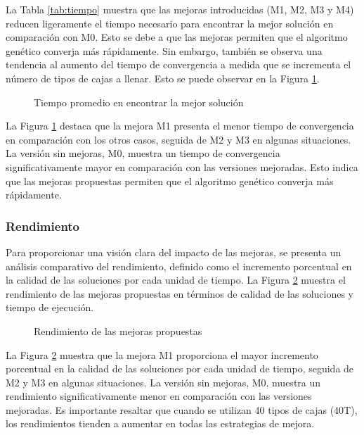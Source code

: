 La Tabla \ref{tab:tiempo} muestra que las mejoras introducidas (M1, M2, M3 y M4) reducen ligeramente el tiempo necesario para encontrar la mejor solución en comparación con M0. Esto se debe a que las mejoras permiten que el algoritmo genético converja más rápidamente. Sin embargo, también se observa una tendencia al aumento del tiempo de convergencia a medida que se incrementa el número de tipos de cajas a llenar. Esto se puede observar en la Figura \ref{fig:tiempos}.

\begin{figure}[H]
    \centering
    
    \caption{Tiempo promedio en encontrar la mejor solución}
    \label{fig:tiempos}
\end{figure}

La Figura \ref{fig:tiempos} destaca que la mejora M1 presenta el menor tiempo de convergencia en comparación con los otros casos, seguida de M2 y M3 en algunas situaciones. La versión sin mejoras, M0, muestra un tiempo de convergencia significativamente mayor en comparación con las versiones mejoradas. Esto indica que las mejoras propuestas permiten que el algoritmo genético converja más rápidamente.

\subsubsection{Rendimiento}

Para proporcionar una visión clara del impacto de las mejoras, se presenta un análisis comparativo del rendimiento, definido como el incremento porcentual en la calidad de las soluciones por cada unidad de tiempo. La Figura \ref{fig:rendimiento} muestra el rendimiento de las mejoras propuestas en términos de calidad de las soluciones y tiempo de ejecución.

\begin{figure}[H]
    \centering
    
    \caption{Rendimiento de las mejoras propuestas}
    \label{fig:rendimiento}
\end{figure}

La Figura \ref{fig:rendimiento} muestra que la mejora M1 proporciona el mayor incremento porcentual en la calidad de las soluciones por cada unidad de tiempo, seguida de M2 y M3 en algunas situaciones. La versión sin mejoras, M0, muestra un rendimiento significativamente menor en comparación con las versiones mejoradas. Es importante resaltar que cuando se utilizan 40 tipos de cajas (40T), los rendimientos tienden a aumentar en todas las estrategias de mejora.

